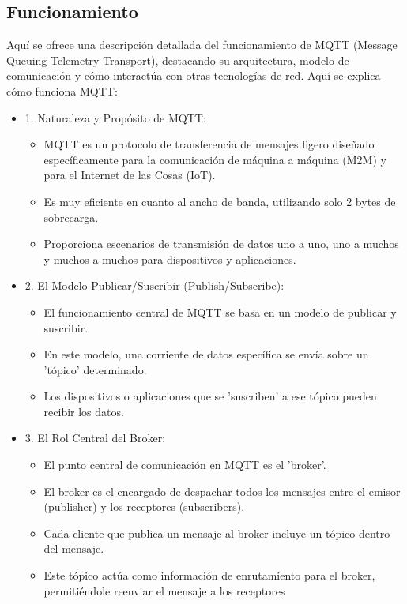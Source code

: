 \documentclass{report}
\begin{document}
\subsection{Funcionamiento}
Aquí se ofrece una descripción detallada del funcionamiento de MQTT (Message Queuing Telemetry Transport), 
destacando su arquitectura, modelo de comunicación y cómo interactúa con otras tecnologías de red.
Aquí se explica cómo funciona MQTT:
\begin{itemize}
    \item 1. Naturaleza y Propósito de MQTT:
        \begin{itemize}
            \item MQTT es un protocolo de transferencia de mensajes ligero diseñado específicamente para la comunicación de máquina a 
            máquina (M2M) y para el Internet de las Cosas (IoT).
            \item Es muy eficiente en cuanto al ancho de banda, utilizando solo 2 bytes de sobrecarga.
            \item Proporciona escenarios de transmisión de datos uno a uno, uno a muchos y muchos a muchos para dispositivos y aplicaciones.
        \end{itemize}
    \item 2. El Modelo Publicar/Suscribir (Publish/Subscribe):
        \begin{itemize}
            \item El funcionamiento central de MQTT se basa en un modelo de publicar y suscribir.
            \item En este modelo, una corriente de datos específica se envía sobre un 'tópico' determinado.
            \item Los dispositivos o aplicaciones que se 'suscriben' a ese tópico pueden recibir los datos.
        \end{itemize}
    \item 3. El Rol Central del Broker:
        \begin{itemize}
            \item El punto central de comunicación en MQTT es el 'broker'.
            \item El broker es el encargado de despachar todos los mensajes entre el emisor (publisher) y los receptores (subscribers).
            \item Cada cliente que publica un mensaje al broker incluye un tópico dentro del mensaje.
            \item Este tópico actúa como información de enrutamiento para el broker, permitiéndole reenviar el mensaje a los receptores 

\end{itemize}
\end{itemize}
\end{document}
